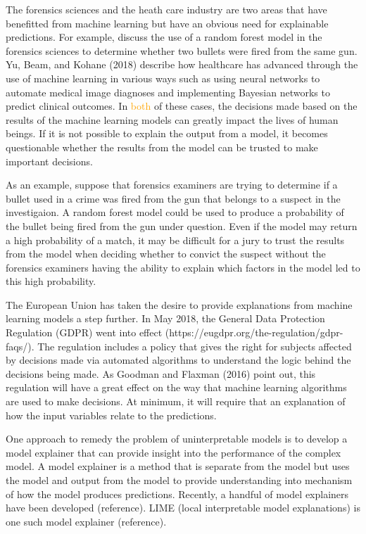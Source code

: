 \documentclass[AMS,STIX2COL]{WileyNJD-v2}\usepackage[]{graphicx}\usepackage[]{color}
\newcommand{\hh}[1]{\textcolor{orange}{#1}}
\begin{document}
The forensics sciences and the heath care industry are two areas that have benefitted from machine learning but have an obvious need for explainable predictions. For example, \citet{aoas} discuss the use of a random forest model in the forensics sciences to determine whether two bullets were fired from the same gun. Yu, Beam, and Kohane (2018) describe how healthcare has advanced through the use of machine learning in various ways such as using neural networks to automate medical image diagnoses and implementing Bayesian networks to predict clinical outcomes. In \hh{both} of these cases, the decisions made based on the results of the machine learning models can greatly impact the lives of human beings. If it is not possible to explain the output from a model, it becomes questionable whether the results from the model can be trusted to make important decisions.

As an example, suppose that forensics examiners are trying to determine if a bullet used in a crime was fired from the gun that belongs to a suspect in the investigaion. A random forest model could be used to produce a probability of the bullet being fired from the gun under question. Even if the model may return a high probability of a match, it may be difficult for a jury to trust the results from the model when deciding whether to convict the suspect without the forensics examiners having the ability to explain which factors in the model led to this high probability.

The European Union has taken the desire to provide explanations from machine learning models a step further. In May 2018, the General Data Protection Regulation (GDPR) went into effect (https://eugdpr.org/the-regulation/gdpr-faqs/). The regulation includes a policy that gives the right for subjects affected by decisions made via automated algorithms to understand the logic behind the decisions being made. As Goodman and Flaxman (2016) point out, this regulation will have a great effect on the way that machine learning algorithms are used to make decisions. At minimum, it will require that an explanation of how the input variables relate to the predictions.

One approach to remedy the problem of uninterpretable models is to develop a model explainer that can provide insight into the performance of the complex model. A model explainer is a method that is separate from the model but uses the model and output from the model to provide understanding into mechanism of how the model produces predictions. Recently, a handful of model explainers have been developed (reference). LIME (local interpretable model explanations) is one such model explainer (reference).
\end{document}
